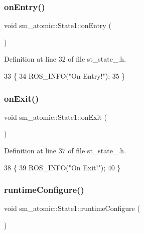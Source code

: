 \subsubsection{\texorpdfstring{on\+Entry()}{onEntry()}}
{\footnotesize\ttfamily void sm\+\_\+atomic\+::\+State1\+::on\+Entry (\begin{DoxyParamCaption}{ }\end{DoxyParamCaption})\hspace{0.3cm}{\ttfamily [inline]}}



Definition at line 32 of file st\+\_\+state\+\_.\+h.


\begin{DoxyCode}
33     \{
34         ROS\_INFO(\textcolor{stringliteral}{"On Entry!"});
35     \}
\end{DoxyCode}
\mbox{\label{structsm__atomic_1_1State1_a712eff5101ad5f9af2d6667230f4ffc3}} 
\subsubsection{\texorpdfstring{on\+Exit()}{onExit()}}
{\footnotesize\ttfamily void sm\+\_\+atomic\+::\+State1\+::on\+Exit (\begin{DoxyParamCaption}{ }\end{DoxyParamCaption})\hspace{0.3cm}{\ttfamily [inline]}}



Definition at line 37 of file st\+\_\+state\+\_.\+h.


\begin{DoxyCode}
38     \{
39         ROS\_INFO(\textcolor{stringliteral}{"On Exit!"});
40     \}
\end{DoxyCode}
\mbox{\label{structsm__atomic_1_1State1_a47c2e651bb707f14d9b32f92c44f8ebc}} 
\subsubsection{\texorpdfstring{runtime\+Configure()}{runtimeConfigure()}}
{\footnotesize\ttfamily void sm\+\_\+atomic\+::\+State1\+::runtime\+Configure (\begin{DoxyParamCaption}{ }\end{DoxyParamCaption})\hspace{0.3cm}{\ttfamily [inline]}}



